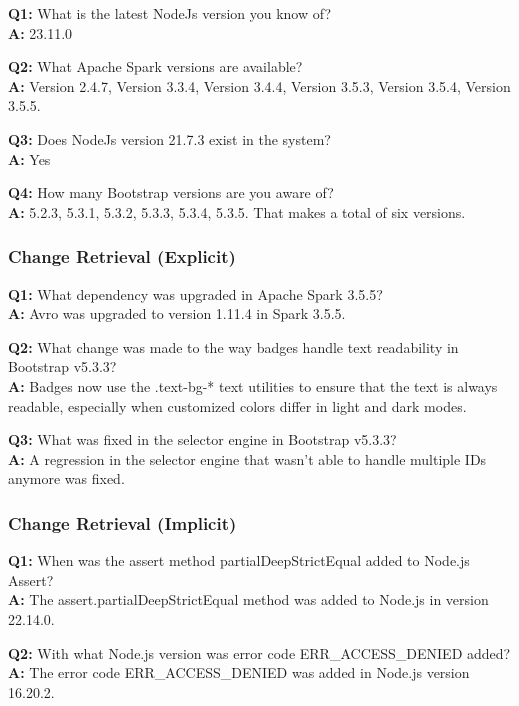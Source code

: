\textbf{Q1:} What is the latest NodeJs version you know of?\\
\textbf{A:} 23.11.0

\textbf{Q2:} What Apache Spark versions are available?\\
\textbf{A:} Version 2.4.7, Version 3.3.4, Version 3.4.4, Version 3.5.3, Version 3.5.4, Version 3.5.5.

\textbf{Q3:} Does NodeJs version 21.7.3 exist in the system?\\
\textbf{A:} Yes

\textbf{Q4:} How many Bootstrap versions are you aware of?\\
\textbf{A:} 5.2.3, 5.3.1, 5.3.2, 5.3.3, 5.3.4, 5.3.5. That makes a total of six versions.

\subsubsection{Change Retrieval (Explicit)}

\textbf{Q1:} What dependency was upgraded in Apache Spark 3.5.5?\\
\textbf{A:} Avro was upgraded to version 1.11.4 in Spark 3.5.5.

\textbf{Q2:} What change was made to the way badges handle text readability in Bootstrap v5.3.3?\\
\textbf{A:} Badges now use the .text-bg-* text utilities to ensure that the text is always readable, especially when customized colors differ in light and dark modes.

\textbf{Q3:} What was fixed in the selector engine in Bootstrap v5.3.3?\\
\textbf{A:} A regression in the selector engine that wasn't able to handle multiple IDs anymore was fixed.

\subsubsection{Change Retrieval (Implicit)}

\textbf{Q1:} When was the assert method partialDeepStrictEqual added to Node.js Assert?\\
\textbf{A:} The assert.partialDeepStrictEqual method was added to Node.js in version 22.14.0.

\textbf{Q2:} With what Node.js version was error code ERR\_ACCESS\_DENIED added?\\
\textbf{A:} The error code ERR\_ACCESS\_DENIED was added in Node.js version 16.20.2.

